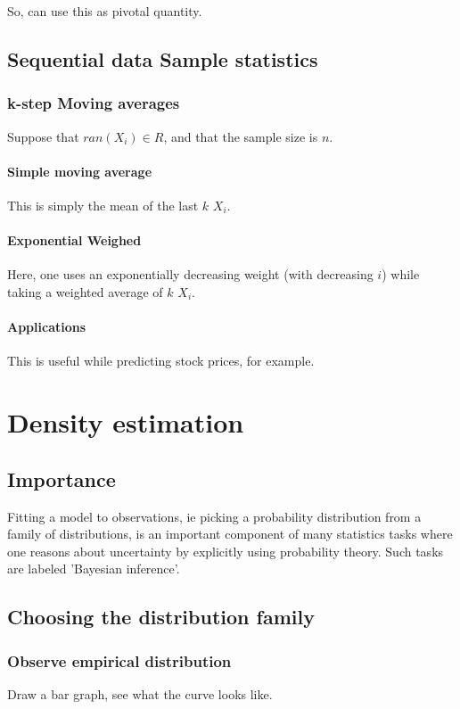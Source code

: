 \documentclass[oneside, article]{memoir}
\begin{document}
So, can use this as pivotal quantity.

\section{Sequential data Sample statistics}
\subsection{k-step Moving averages}
Suppose that $ran(X_i) \in R$, and that the sample size is $n$.

\subsubsection{Simple moving average}
This is simply the mean of the last $k$ ${X_i}$.

\subsubsection{Exponential Weighed}
Here, one uses an exponentially decreasing weight (with decreasing $i$) while taking a weighted average of $k$  ${X_i}$.

\subsubsection{Applications}
This is useful while predicting stock prices, for example.

\chapter{Density estimation}
\section{Importance}
Fitting a model to observations, ie picking a probability distribution from a family of distributions, is an important component of many statistics tasks where one reasons about uncertainty by explicitly using probability theory. Such tasks are labeled 'Bayesian inference'.

\section{Choosing the distribution family}
\subsection{Observe empirical distribution}
Draw a bar graph, see what the curve looks like.
\end{document}
